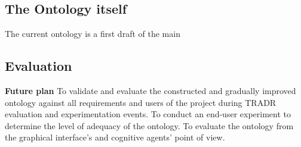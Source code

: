 \begin{itemize}
\begin{itemize}
\end{itemize}


\subsection{The Ontology itself}

The current ontology is a first draft of the main 

\subsection{Evaluation}



\textbf{Future plan}
To validate and evaluate the constructed and gradually improved ontology against all requirements and users of the project during TRADR evaluation and experimentation events. To conduct an end-user experiment to determine the level of adequacy of the ontology. To evaluate the ontology from the graphical interface's and cognitive agents' point of view.  

\end{itemize}
  
  
  
  
  
  
  